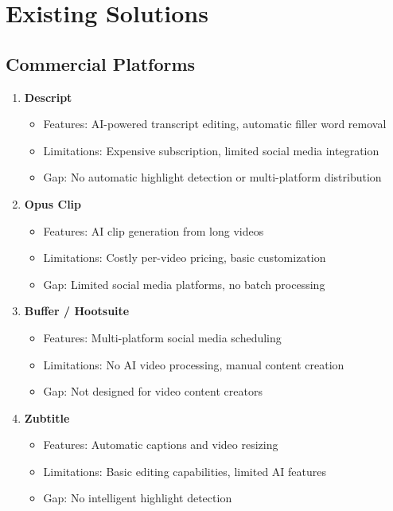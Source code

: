 \section{Existing Solutions}

\subsection{Commercial Platforms}

\begin{enumerate}
    \item \textbf{Descript}
    \begin{itemize}
        \item Features: AI-powered transcript editing, automatic filler word removal
        \item Limitations: Expensive subscription, limited social media integration
        \item Gap: No automatic highlight detection or multi-platform distribution
    \end{itemize}
    
    \item \textbf{Opus Clip}
    \begin{itemize}
        \item Features: AI clip generation from long videos
        \item Limitations: Costly per-video pricing, basic customization
        \item Gap: Limited social media platforms, no batch processing
    \end{itemize}
    
    \item \textbf{Buffer / Hootsuite}
    \begin{itemize}
        \item Features: Multi-platform social media scheduling
        \item Limitations: No AI video processing, manual content creation
        \item Gap: Not designed for video content creators
    \end{itemize}
    
    \item \textbf{Zubtitle}
    \begin{itemize}
        \item Features: Automatic captions and video resizing
        \item Limitations: Basic editing capabilities, limited AI features
        \item Gap: No intelligent highlight detection
    \end{itemize}
\end{enumerate}

